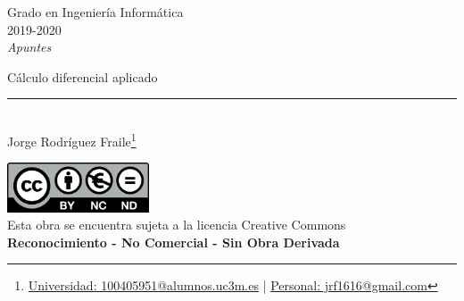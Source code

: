 \documentclass[12pt, twoside, openright]{report} %
\begin{document}
	
\begin{titlepage}
	\begin{sffamily}
	\color{azulUC3M}
	\begin{center}
		\begin{figure}[H] %
		\end{figure}
		\vspace{2.5cm}
		\begin{Large}
			Grado en Ingeniería Informática\\			
			2019-2020\\
			\vspace{2cm}		
			\textsl{Apuntes}\\
			\bigskip
		\end{Large}
		 	{\Huge Cálculo diferencial aplicado}\\
		 	\vspace*{0.5cm}
	 		\rule{10.5cm}{0.1mm}\\
			\vspace*{0.9cm}
			{\LARGE Jorge Rodríguez Fraile\footnote{\href{mailto:100405951@alumnos.uc3m.es}{Universidad: 100405951@alumnos.uc3m.es}  |  \href{mailto:jrf1616@gmail.com}{Personal: jrf1616@gmail.com}}}\\ 
			\vspace*{1cm}
	\end{center}
	\vfill
	\color{black}
		\includegraphics[width=4.2cm]{img/creativecommons.png}\\
		Esta obra se encuentra sujeta a la licencia Creative Commons\\ \textbf{Reconocimiento - No Comercial - Sin Obra Derivada}
	\end{sffamily}
\end{titlepage}


\tableofcontents
\thispagestyle{fancy}
\end{document}
